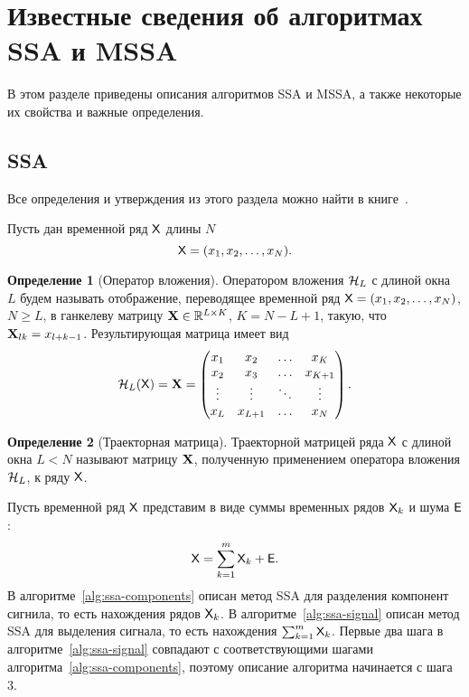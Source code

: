 \documentclass{article}
\theoremstyle{plain}
\theoremstyle{definition}
\newtheorem{definition}{Определение}[section]
\theoremstyle{remark}
\begin{document}
\section{Известные сведения об алгоритмах SSA и MSSA}\label{sec:known-results-ssa}
В этом разделе приведены описания алгоритмов SSA и MSSA, а также некоторые их свойства и важные определения.

\subsection{SSA}\label{subsec:ssa}
Все определения и утверждения из этого раздела можно найти в книге~\cite{ssa}.

Пусть дан временной ряд $\mathsf{X}$ длины $N$
\[
  \mathsf{X}=(x_1,x_2,\ldots,x_N).
\]

\begin{definition}[Оператор вложения]
  \label{def:injection-op}
  Оператором вложения $\mathcal{H}_L$ с длиной окна $L$ будем называть отображение, переводящее временной ряд
  $\mathsf{X}=(x_1, x_2,\ldots, x_N)$, $N \geqslant L$, в ганкелеву матрицу $\mathbf{X}\in \mathbb{R}^{L \times K}$, $K = N-L+1$,
  такую, что $\mathbf{X}_{lk}=x_{l+k-1}$.
  Результирующая матрица имеет вид
  \[
    \mathcal{H}_L(\mathsf{X}) = \mathbf{X} =
    \begin{pmatrix}
      x_1    & x_2     & \ldots & x_K     \\
      x_2    & x_3     & \ldots & x_{K+1} \\
      \vdots & \vdots  & \ddots & \vdots  \\
      x_L    & x_{L+1} & \ldots & x_N
    \end{pmatrix}.
  \]
\end{definition}

\begin{definition}[Траекторная матрица]
  Траекторной матрицей ряда $\mathsf{X}$ с длиной окна $L<N$ называют матрицу $\mathbf{X}$, полученную применением оператора
  вложения $\mathcal{H}_L$, к ряду $\mathsf{X}$.
\end{definition}

Пусть временной ряд $\mathsf{X}$ представим в виде суммы временных рядов $\mathsf{X}_k$ и шума $\mathsf{E}$:
\[
  \mathsf{X} = \sum_{k=1}^{m} \mathsf{X}_k + \mathsf{E}.
\]
В алгоритме~\ref{alg:ssa-components} описан метод SSA для разделения компонент сигнила, то есть
нахождения рядов $\mathsf{X}_k$.
В алгоритме~\ref{alg:ssa-signal} описан метод SSA для выделения сигнала, то есть нахождения $\sum_{k=1}^{m} \mathsf{X}_k$.
Первые два шага в алгоритме~\ref{alg:ssa-signal} совпадают с соответствующими шагами
алгоритма~\ref{alg:ssa-components}, поэтому описание алгоритма начинается с шага 3.
\end{document}
